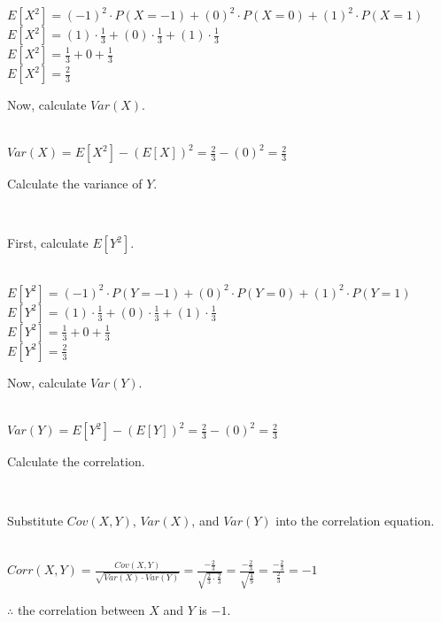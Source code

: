 \documentclass{article}
\begin{document}
$E[X^2] = (-1)^2 \cdot P(X = -1) + (0)^2 \cdot P(X = 0) + (1)^2 \cdot P(X = 1)$\\

$E[X^2] = (1) \cdot \frac{1}{3} + (0) \cdot \frac{1}{3} + (1) \cdot \frac{1}{3}$\\

$E[X^2] = \frac{1}{3} + 0 + \frac{1}{3}$\\

$E[X^2] = \frac{2}{3}$\\

\parbox{\textwidth}{Now, calculate $Var(X)$.}\\

$Var(X) = E[X^2] - (E[X])^2 = \frac{2}{3} - (0)^2 = \frac{2}{3}$\\

\parbox{\textwidth}{Calculate the variance of $Y$.}\\

\parbox{\textwidth}{First, calculate $E[Y^2]$.}\\

$E[Y^2] = (-1)^2 \cdot P(Y = -1) + (0)^2 \cdot P(Y = 0) + (1)^2 \cdot P(Y = 1)$\\

$E[Y^2] = (1) \cdot \frac{1}{3} + (0) \cdot \frac{1}{3} + (1) \cdot \frac{1}{3}$\\

$E[Y^2] = \frac{1}{3} + 0 + \frac{1}{3}$\\

$E[Y^2] = \frac{2}{3}$\\

\parbox{\textwidth}{Now, calculate $Var(Y)$.}\\

$Var(Y) = E[Y^2] - (E[Y])^2 = \frac{2}{3} - (0)^2 = \frac{2}{3}$\\

\parbox{\textwidth}{Calculate the correlation.}\\

\parbox{\textwidth}{Substitute $Cov(X,Y)$, $Var(X)$, and $Var(Y)$ into the correlation equation.}\\

$Corr(X,Y) = \frac{Cov(X,Y)}{\sqrt{Var(X) \cdot Var(Y)}} = \frac{-\frac{2}{3}}{\sqrt{\frac{2}{3} \cdot \frac{2}{3}}} = \frac{-\frac{2}{3}}{\sqrt{\frac{4}{9}}} = \frac{-\frac{2}{3}}{\frac{2}{3}} = -1$\\

\parbox{\textwidth}{$\therefore$ the correlation between $X$ and $Y$ is $-1$.}\\
\end{document}
